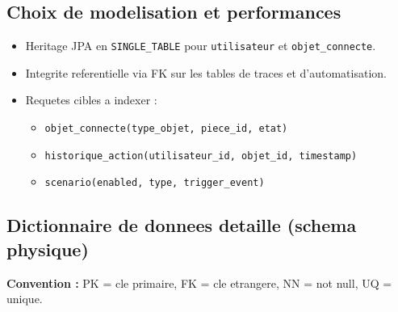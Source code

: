 \documentclass[11pt,a4paper]{article}
\begin{document}
\subsection{Choix de modelisation et performances}
\begin{itemize}
  \item Heritage JPA en \texttt{SINGLE\_TABLE} pour \texttt{utilisateur} et \texttt{objet\_connecte}.
  \item Integrite referentielle via FK sur les tables de traces et d'automatisation.
  \item Requetes cibles a indexer :
  \begin{itemize}
    \item \texttt{objet\_connecte(type\_objet, piece\_id, etat)}
    \item \texttt{historique\_action(utilisateur\_id, objet\_id, timestamp)}
    \item \texttt{scenario(enabled, type, trigger\_event)}
  \end{itemize}
\end{itemize}

\subsection{Dictionnaire de donnees detaille (schema physique)}

\textbf{Convention :} PK = cle primaire, FK = cle etrangere, NN = not null, UQ = unique.
\end{document}
